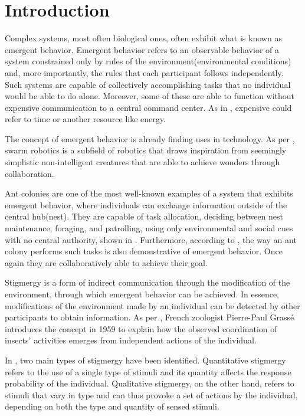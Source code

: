 \section{Introduction}
Complex systems, most often biological ones, often exhibit what is known as emergent behavior. Emergent behavior refers to an observable behavior of a system constrained only by rules of the environment(environmental conditions) and, more importantly, the rules that each participant follows independently. Such systems are capable of collectively accomplishing tasks that no individual would be able to do alone. Moreover, some of these are able to function without expensive communication to a central command center. As in \parencite{marsh_demystification_2009}, expensive could refer to time or another resource like energy. 
\par The concept of emergent behavior is already finding uses in technology. As per \parencite{schranz_swarm_2020}, swarm robotics is a subfield of robotics that draws inspiration from seemingly simplistic non-intelligent creatures that are able to achieve wonders through collaboration.
\par Ant colonies are one of the most well-known examples of a system that exhibits emergent behavior, where individuals can exchange information outside of the central hub(nest). They are capable of task allocation, deciding between nest maintenance, foraging, and patrolling, using only environmental and social cues with no central authority, shown in \parencite{gordon_organization_1996}. Furthermore, according to \parencite{adler_information_1992}, the way an ant colony performs such tasks is also demonstrative of emergent behavior. Once again they are collaboratively able to achieve their goal.
\par Stigmergy is a form of indirect communication through the modification of the environment, through which emergent behavior can be achieved. In essence, modifications of the environment made by an individual can be detected by other participants to obtain information. As per \parencite{theraulaz_brief_1999}, French zoologist Pierre-Paul Grass\'e introduces the concept in 1959 to explain how the observed coordination of insects' activities emerges from independent actions of the individual.
\par In \parencite{theraulaz_brief_1999}, two main types of stigmergy have been identified. Quantitative stigmergy refers to the use of a single type of stimuli and its quantity affects the response probability of the individual. Qualitative stigmergy, on the other hand, refers to stimuli that vary in type and can thus provoke a set of actions by the individual, depending on both the type and quantity of sensed stimuli.
